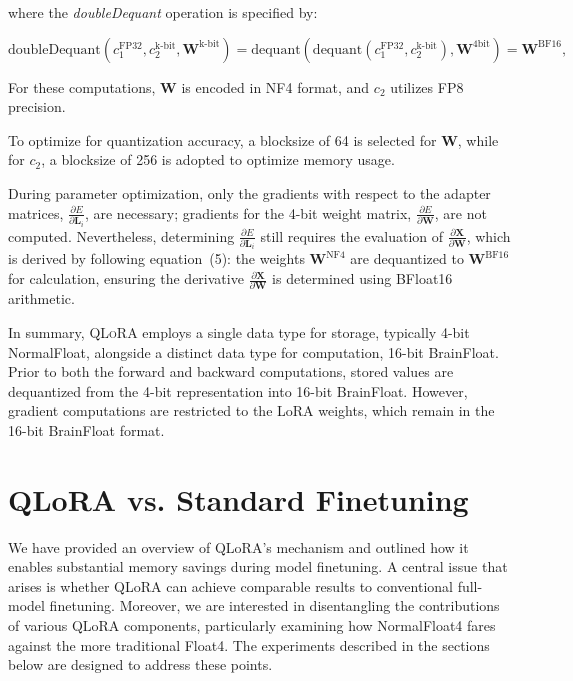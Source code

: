 where the \textit{doubleDequant} operation is specified by:

\begin{equation}
    \text{doubleDequant}(c_1^{\text{FP32}}, c_2^{\text{k-bit}}, \mathbf{W}^{\text{k-bit}}) = \text{dequant}(\text{dequant}(c_1^{\text{FP32}}, c_2^{\text{k-bit}}), \mathbf{W}^{\text{4bit}}) = \mathbf{W}^{\text{BF16}},
\end{equation}

For these computations, $\mathbf{W}$ is encoded in NF4 format, and $c_2$ utilizes FP8 precision.

To optimize for quantization accuracy, a blocksize of 64 is selected for $\mathbf{W}$, while for $c_2$, a blocksize of 256 is adopted to optimize memory usage.

During parameter optimization, only the gradients with respect to the adapter matrices, $\frac{\partial E}{\partial \mathbf{L}_i}$, are necessary; gradients for the 4-bit weight matrix, $\frac{\partial E}{\partial \mathbf{W}}$, are not computed. Nevertheless, determining $\frac{\partial E}{\partial \mathbf{L}_i}$ still requires the evaluation of $\frac{\partial \mathbf{X}}{\partial \mathbf{W}}$, which is derived by following equation~(5): the weights $\mathbf{W}^{\text{NF4}}$ are dequantized to $\mathbf{W}^{\text{BF16}}$ for calculation, ensuring the derivative $\frac{\partial \mathbf{X}}{\partial \mathbf{W}}$ is determined using BFloat16 arithmetic.

In summary, \textsc{QLoRA} employs a single data type for storage, typically 4-bit NormalFloat, alongside a distinct data type for computation, 16-bit BrainFloat. Prior to both the forward and backward computations, stored values are dequantized from the 4-bit representation into 16-bit BrainFloat. However, gradient computations are restricted to the LoRA weights, which remain in the 16-bit BrainFloat format.

\section{QLoRA vs. Standard Finetuning}
\label{sec:comp_to_std}

We have provided an overview of QLoRA's mechanism and outlined how it enables substantial memory savings during model finetuning. A central issue that arises is whether QLoRA can achieve comparable results to conventional full-model finetuning. Moreover, we are interested in disentangling the contributions of various QLoRA components, particularly examining how NormalFloat4 fares against the more traditional Float4. The experiments described in the sections below are designed to address these points.

